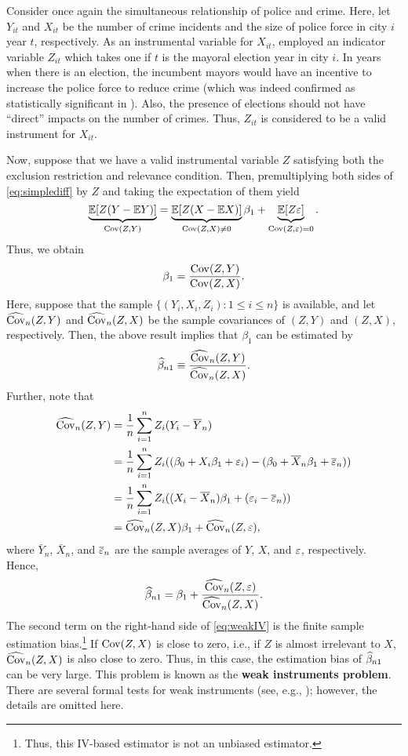 \documentclass[11pt, A4paper, openany, uplatex]{book}
\begin{document}
\begin{example}\upshape
	Consider once again the simultaneous relationship of police and crime.
	Here, let $Y_{it}$ and $X_{it}$ be the number of crime incidents and the size of police force in city $i$ year $t$, respectively.
	As an instrumental variable for $X_{it}$, \cite{levitt1997using} employed an indicator variable $Z_{it}$ which takes one if $t$ is the mayoral election year in city $i$.
	In years when there is an election, the incumbent mayors would have an incentive to increase the police force to reduce crime (which was indeed confirmed as statistically significant in \cite{levitt1997using}).
	Also, the presence of elections should not have ``direct'' impacts on the number of crimes.
	Thus, $Z_{it}$ is considered to be a valid instrument for $X_{it}$. 
\end{example}

Now, suppose that we have a valid instrumental variable $Z$ satisfying both the exclusion restriction and relevance condition.
Then, premultiplying both sides of \eqref{eq:simplediff} by $Z$ and taking the expectation of them yield
\[
	\underbrace{\mathbb{E}[Z (Y - \mathbb{E} Y)]}_{\mathrm{Cov}(Z, Y)} = \underbrace{\mathbb{E}[Z (X - \mathbb{E} X)]}_{\mathrm{Cov}(Z, X) \neq 0} \beta_1 + \underbrace{\mathbb{E}[Z \varepsilon]}_{\mathrm{Cov}(Z, \varepsilon) = 0}.
\]
Thus, we obtain
\[
	\beta_1 = \frac{\mathrm{Cov}(Z, Y)}{\mathrm{Cov}(Z, X)}.
\]
Here, suppose that the sample $\{(Y_i, X_i, Z_i): 1 \le i \le n\}$ is available, and let $\widehat{\mathrm{Cov}}_n(Z, Y)$ and $\widehat{\mathrm{Cov}}_n(Z, X)$ be the sample covariances of $(Z, Y)$ and $(Z, X)$, respectively.
Then, the above result implies that $\beta_1$ can be estimated by
\[
	\widehat{\beta}_{n1} \equiv \frac{\widehat{\mathrm{Cov}}_n(Z, Y)}{\widehat{\mathrm{Cov}}_n(Z, X)}.
\] 
Further, note that 
\begin{align*}
	\widehat{\mathrm{Cov}}_n(Z, Y) 
	& = \frac{1}{n}\sum_{i = 1}^n Z_i (Y_i - \overline Y_n) \\
	& = \frac{1}{n}\sum_{i = 1}^n Z_i ((\beta_0 + X_i\beta_1 + \varepsilon_i) - (\beta_0 + \overline X_n \beta_1 + \overline {\varepsilon}_n))\\ 
	& =\frac{1}{n}\sum_{i = 1}^n Z_i ((X_i - \overline X_n) \beta_1 + (\varepsilon_i - \overline {\varepsilon}_n))\\ 
	& = \widehat{\mathrm{Cov}}_n(Z, X)\beta_1 + \widehat{\mathrm{Cov}}_n(Z, \varepsilon),
\end{align*}
where $\bar Y_n$, $\bar X_n$, and $\overline {\varepsilon}_n$ are the sample averages of $Y$, $X$, and $\varepsilon$, respectively.
Hence, 
\begin{align}\label{eq:weakIV}
	\widehat{\beta}_{n1} = \beta_1 + \frac{\widehat{\mathrm{Cov}}_n(Z, \varepsilon)}{\widehat{\mathrm{Cov}}_n(Z, X)}.
\end{align}
The second term on the right-hand side of \eqref{eq:weakIV} is the finite sample estimation bias.\footnote{
	Thus, this IV-based estimator is not an unbiased estimator.
}
If $\mathrm{Cov}(Z,X)$ is close to zero, i.e., if $Z$ is almost irrelevant to $X$, $\widehat{\mathrm{Cov}}_n(Z, X)$ is also close to zero.
Thus, in this case, the estimation bias of $\widehat{\beta}_{n1}$ can be very large.
This problem is known as the \textbf{weak instruments problem}. 
There are several formal tests for weak instruments (see, e.g., \cite{stock2005testing}); however, the details are omitted here.
\end{document}
